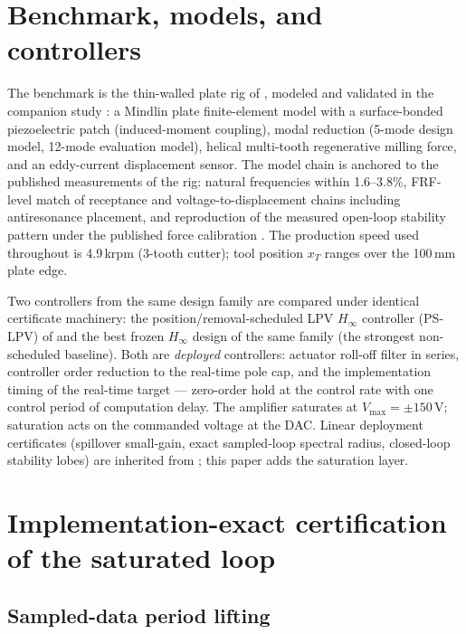 \documentclass[preprint,12pt]{elsarticle}
\newcommand{\hinf}{\ensuremath{H_\infty}}
\begin{document}
\section{Benchmark, models, and controllers}
\label{sec:model}

The benchmark is the thin-walled plate rig of \cite{du2024robust},
modeled and validated in the companion study \cite{companion}: a
Mindlin plate finite-element model with a surface-bonded
piezoelectric patch (induced-moment coupling), modal reduction
(5-mode design model, 12-mode evaluation model), helical multi-tooth
regenerative milling force, and an eddy-current displacement sensor.
The model chain is anchored to the published measurements of the rig:
natural frequencies within 1.6--3.8\%, FRF-level match of receptance
and voltage-to-displacement chains including antiresonance placement,
and reproduction of the measured open-loop stability pattern under
the published force calibration \cite{companion}. The production
speed used throughout is 4.9\,krpm (3-tooth cutter); tool position
$x_T$ ranges over the 100\,mm plate edge.

Two controllers from the same design family are compared under
identical certificate machinery: the position/removal-scheduled LPV
\hinf{} controller (PS-LPV) of \cite{companion} and the best frozen
\hinf{} design of the same family (the strongest non-scheduled
baseline). Both are \emph{deployed} controllers: actuator roll-off
filter in series, controller order reduction to the real-time pole
cap, and the implementation timing of the real-time target ---
zero-order hold at the control rate with one control period of
computation delay. The amplifier saturates at
$V_{\max}=\pm150$\,V; saturation acts on the commanded voltage at the
DAC. Linear deployment certificates (spillover small-gain, exact
sampled-loop spectral radius, closed-loop stability lobes) are
inherited from \cite{companion}; this paper adds the saturation
layer.

\section{Implementation-exact certification of the saturated loop}
\label{sec:cert}

\subsection{Sampled-data period lifting}
\end{document}
